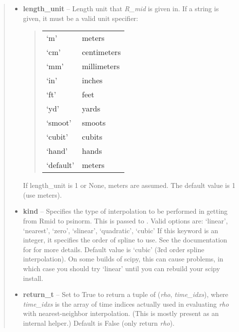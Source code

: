 \documentclass[letterpaper,10pt,english]{sphinxmanual}
\begin{document}
\begin{fulllineitems}
\begin{fulllineitems}
\begin{quote}
\begin{description}
\begin{itemize}
\item {} 
\textbf{length\_unit} -- 
Length unit that \emph{R\_mid} is given in.
If a string is given, it must be a valid unit specifier:
\begin{quote}

\begin{tabulary}{\linewidth}{|L|L|}
\hline

`m'
 & 
meters
\\

`cm'
 & 
centimeters
\\

`mm'
 & 
millimeters
\\

`in'
 & 
inches
\\

`ft'
 & 
feet
\\

`yd'
 & 
yards
\\

`smoot'
 & 
smoots
\\

`cubit'
 & 
cubits
\\

`hand'
 & 
hands
\\

`default'
 & 
meters
\\
\hline\end{tabulary}

\end{quote}

If length\_unit is 1 or None, meters are assumed. The default
value is 1 (use meters).


\item {} 
\textbf{kind} -- Specifies the type of
interpolation to be performed in getting from Rmid to
psinorm. This is passed to
. Valid options are:
`linear', `nearest', `zero', `slinear', `quadratic', `cubic'
If this keyword is an integer, it specifies the order of spline
to use. See the documentation for  for more
details. Default value is `cubic' (3rd order spline
interpolation). On some builds of scipy, this can cause problems,
in which case you should try `linear' until you can rebuild your
scipy install.

\item {} 
\textbf{return\_t} -- Set to True to return a tuple of (\emph{rho},
\emph{time\_idxs}), where \emph{time\_idxs} is the array of time indices
actually used in evaluating \emph{rho} with nearest-neighbor
interpolation. (This is mostly present as an internal helper.)
Default is False (only return \emph{rho}).


\end{itemize}
\end{description}
\end{quote}
\end{fulllineitems}
\end{fulllineitems}
\end{document}
